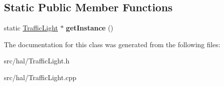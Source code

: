 \subsection*{Static Public Member Functions}
\begin{DoxyCompactItemize}
\item 
\hypertarget{classTrafficLight_aea8fff7123abb6e9935992e60be85780}{static \hyperlink{classTrafficLight}{Traffic\-Light} $\ast$ {\bfseries get\-Instance} ()}\label{classTrafficLight_aea8fff7123abb6e9935992e60be85780}

\end{DoxyCompactItemize}


The documentation for this class was generated from the following files\-:\begin{DoxyCompactItemize}
\item 
src/hal/Traffic\-Light.\-h\item 
src/hal/Traffic\-Light.\-cpp\end{DoxyCompactItemize}
